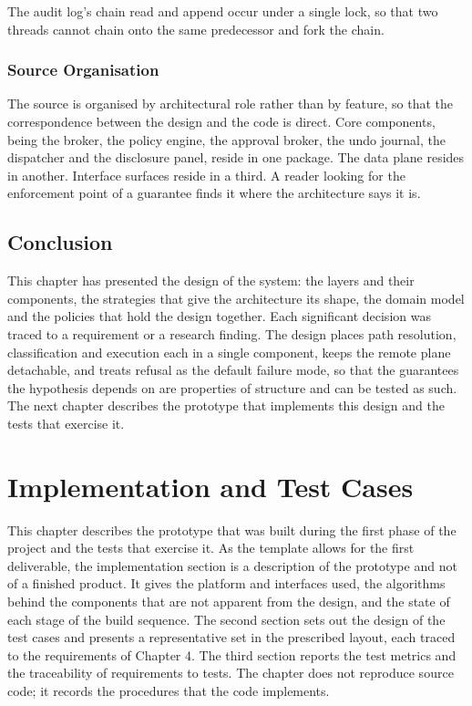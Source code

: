 \documentclass{FastFyp}
\begin{document}
The audit log's chain read and append occur under a single lock, so that two threads cannot chain onto the same predecessor and fork the chain.

\subsection{Source Organisation}
The source is organised by architectural role rather than by feature, so that the correspondence between the design and the code is direct. Core components, being the broker, the policy engine, the approval broker, the undo journal, the dispatcher and the disclosure panel, reside in one package. The data plane resides in another. Interface surfaces reside in a third. A reader looking for the enforcement point of a guarantee finds it where the architecture says it is.


\section{Conclusion}
This chapter has presented the design of the system: the layers and their components, the strategies that give the architecture its shape, the domain model and the policies that hold the design together. Each significant decision was traced to a requirement or a research finding. The design places path resolution, classification and execution each in a single component, keeps the remote plane detachable, and treats refusal as the default failure mode, so that the guarantees the hypothesis depends on are properties of structure and can be tested as such. The next chapter describes the prototype that implements this design and the tests that exercise it.

\chapter{Implementation and Test Cases}
This chapter describes the prototype that was built during the first phase of the project and the tests that exercise it. As the template allows for the first deliverable, the implementation section is a description of the prototype and not of a finished product. It gives the platform and interfaces used, the algorithms behind the components that are not apparent from the design, and the state of each stage of the build sequence. The second section sets out the design of the test cases and presents a representative set in the prescribed layout, each traced to the requirements of Chapter 4. The third section reports the test metrics and the traceability of requirements to tests. The chapter does not reproduce source code; it records the procedures that the code implements.
\end{document}
